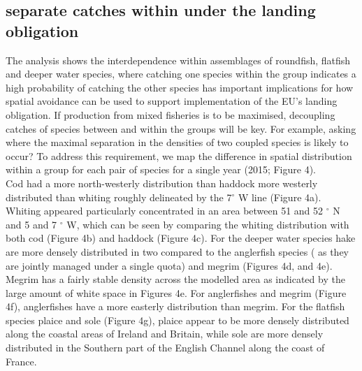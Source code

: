 \documentclass[fleqn,10pt]{wlscirep}
\begin{document}
\begin{linenumbers}
\subsection*{  separate catches
	within  under the landing
	obligation\deleted[id = CM]{:}\\} The analysis shows the
interdependence within  assemblages of roundfish, flatfish
and deeper water species, where catching one species within the group indicates
a high probability of catching the other species has important implications for how spatial avoidance can be used
to support implementation of the EU's landing obligation. If production from
mixed fisheries is to be maximised, decoupling catches of species between and
within the groups will be key. For example, asking where the maximal separation
in the densities of two coupled species is likely to occur? To address this
requirement, we map the difference in spatial distribution within a
group for each pair of species for a single year (2015; Figure 4). \\

Cod had a more north-westerly distribution than haddock  more westerly distributed than whiting roughly
delineated by the 7$^{\circ}$ W line (Figure 4a). Whiting appeared particularly
concentrated in an area between 51 and 52 $^{\circ}$ N and 5 and 7 $^{\circ}$
W, which can be seen by comparing the whiting distribution with both cod
(Figure 4b) and haddock (Figure 4c). For the deeper water species hake are more
densely distributed in two  compared to the anglerfish species
( as they are jointly managed under a single quota) and megrim
(Figures 4d, and
4e). Megrim has a fairly stable density across the modelled area as indicated
by the large amount of white space in Figures 4e. For anglerfishes and megrim
(Figure 4f), anglerfishes have a more easterly distribution than megrim.  For
the flatfish species plaice and sole (Figure 4g), plaice appear to be more
densely distributed along the coastal areas of Ireland and Britain, while sole
are more densely distributed in the Southern part of the English Channel along
the coast of France.\\


\end{linenumbers}
\end{document}
